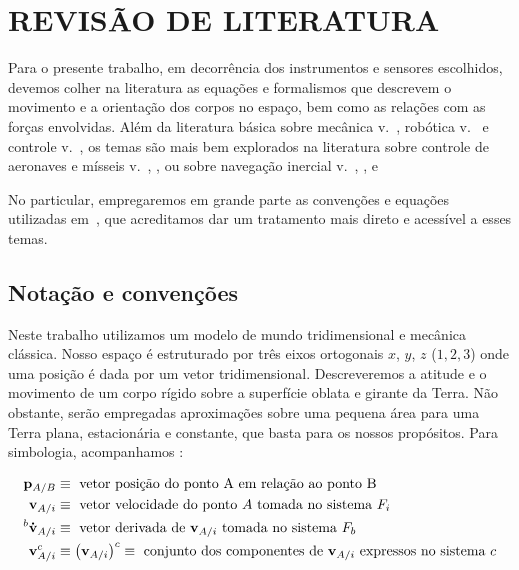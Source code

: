\chapter{REVISÃO DE LITERATURA}\label{chap:fundamentacaoTeorica}

Para o presente trabalho, em decorrência dos instrumentos e sensores escolhidos, devemos colher na literatura as equações e formalismos que descrevem o movimento e a orientação dos corpos no espaço, bem como as relações com as forças envolvidas. Além da literatura básica sobre mecânica v.~\cite{Goldstein1980}, robótica v.~\cite{Craig2014} e controle v.~\cite{Ogata2010}, os temas são mais bem explorados na literatura sobre controle de aeronaves e mísseis v.~\cite{Henderson1997}, \cite{Stevens2016}, \cite{Blakelock1991} ou sobre navegação inercial v.~\cite{Stovall1997}, \cite{Weston2004}, \cite{Wang2021} e~\cite{Haoran2019}

No particular, empregaremos em grande parte as convenções e equações utilizadas em~\cite{Stevens2016}, que acreditamos dar um tratamento mais direto e acessível a esses temas.

\section{Notação e convenções}

Neste trabalho utilizamos um modelo de mundo tridimensional e mecânica clássica.  Nosso espaço é estruturado por três eixos ortogonais \(x\), \(y\), \(z\) (\(1, 2, 3\)) onde uma posição é dada por um vetor tridimensional. Descreveremos a atitude e o movimento de um corpo rígido sobre a superfície oblata e girante da Terra. Não obstante, serão empregadas aproximações sobre uma pequena área para uma Terra plana, estacionária e constante, que basta\footnotemark{} para os nossos propósitos. Para simbologia, acompanhamos \cite{Stevens2016}:

\begin{align*}
    \mathbf{p}_{A/B} &\equiv
    \text{ vetor posição do ponto A em relação ao ponto B} \\
    \mathbf{v}_{A/i} &\equiv
    \text{ vetor velocidade do ponto \(A\) tomada no sistema \(F_{i}\)} \\
    ^{b}\mathbf{\dot{v}}_{A/i} &\equiv
    \text{ vetor derivada de \(\mathbf{v}_{A/i}\) tomada no sistema \( F_{b}\)} \\
    \mathbf{v}^{c}_{A/i} &\equiv \left( \mathbf{v}_{A/i} \right)^{c} \equiv
    \text{ conjunto dos componentes de \(\mathbf{v}_{A/i}\) expressos no sistema \(c\)} \\
\end{align*}

